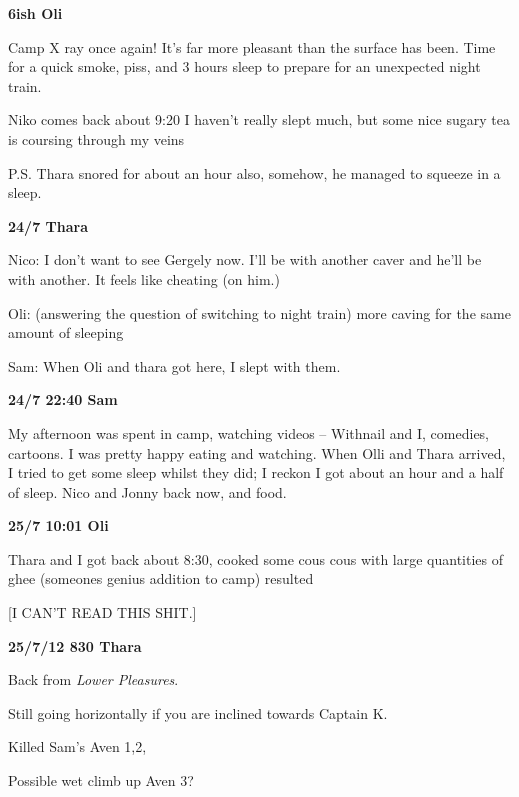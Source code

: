 \textbf{6ish Oli}

Camp X ray once again! It's far more pleasant than the surface has been.
Time for a quick smoke, piss, and 3 hours sleep to prepare for an
unexpected night train.

Niko comes back about 9:20 I haven't really slept much, but some nice
sugary tea is coursing through my veins

P.S. Thara snored for about an hour also, somehow, he managed to squeeze
in a sleep.

\textbf{24/7 Thara}

Nico: I don't want to see Gergely now. I'll be with another caver and
he'll be with another. It feels like cheating (on him.)

Oli: (answering the question of switching to night train) more caving
for the same amount of sleeping

Sam: When Oli and thara got here, I slept with them.

\textbf{24/7 22:40 Sam}

My afternoon was spent in camp, watching videos -- Withnail and I,
comedies, cartoons. I was pretty happy eating and watching. When Olli
and Thara arrived, I tried to get some sleep whilst they did; I reckon I
got about an hour and a half of sleep. Nico and Jonny back now, and
food.

\textbf{25/7 10:01 Oli}

Thara and I got back about 8:30, cooked some cous cous with large
quantities of ghee (someones genius addition to camp) resulted

{[}I CAN'T READ THIS SHIT.{]}

\textbf{25/7/12 830 Thara}

Back from \emph{Lower Pleasures}.

Still going horizontally if you are inclined towards Captain K.

Killed Sam's Aven 1,2,

Possible wet climb up Aven 3?

